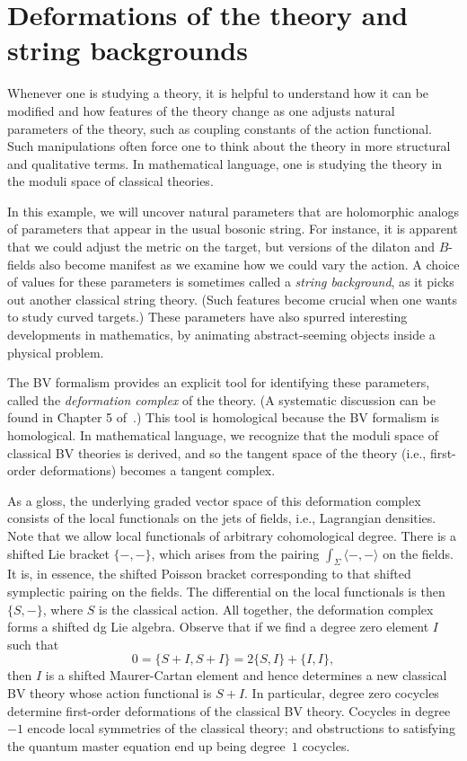 \section{Deformations of the theory and string backgrounds}
\label{sec: moduli}

\def\wt{{\rm wt}}

Whenever one is studying a theory,
it is helpful to understand how it can be modified 
and how features of the theory change as one adjusts natural parameters of the theory,
such as coupling constants of the action functional.
Such manipulations often force one to think about the theory in more structural and qualitative terms.
In mathematical language, one is studying the theory in the moduli space of classical theories.

In this example, we will uncover natural parameters that are holomorphic analogs of parameters that appear in the usual bosonic string.
For instance, it is apparent that we could adjust the metric on the target,
but versions of the dilaton and $B$-fields also become manifest as we examine how we could vary the action.
A choice of values for these parameters is sometimes called a {\em string background},
as it picks out another classical string theory.
(Such features become crucial when one wants to study curved targets.)
These parameters have also spurred interesting developments in mathematics,
by animating abstract-seeming objects inside a physical problem.

The BV formalism provides an explicit tool for identifying these parameters,
called the {\em deformation complex} of the theory.
(A systematic discussion can be found in Chapter 5 of~\cite{CosBook}.)
This tool is homological because the BV formalism is homological.
In mathematical language, we recognize that the moduli space of classical BV theories is derived,
and so the tangent space of the theory (i.e., first-order deformations) becomes a tangent complex.

As a gloss, the underlying graded vector space of this deformation complex consists of the local functionals on the jets of fields, i.e., Lagrangian densities.
Note that we allow local functionals of arbitrary cohomological degree. 
There is a shifted Lie bracket $\{-,-\}$, 
which arises from the pairing $\int_\Sigma \langle-,-\rangle$ on the fields.
It is, in essence, the shifted Poisson bracket corresponding to that shifted symplectic pairing on the fields.
The differential on the local functionals is then $\{S,-\}$, where $S$ is the classical action. 
All together, the deformation complex forms a shifted dg Lie algebra. 
Observe that if we find a degree zero element $I$ such that
\[
0=\{S +I,S +I\}=2\{S,I\}+\{I,I\},
\]
then $I$ is a shifted Maurer-Cartan element and 
hence determines a new classical BV theory whose action functional is $S + I$. 
In particular, degree zero cocycles determine first-order deformations of the classical BV theory. 
Cocycles in degree~$-1$ encode local symmetries of the classical theory; 
and obstructions to satisfying the quantum master equation end up being degree~$1$ cocycles.

